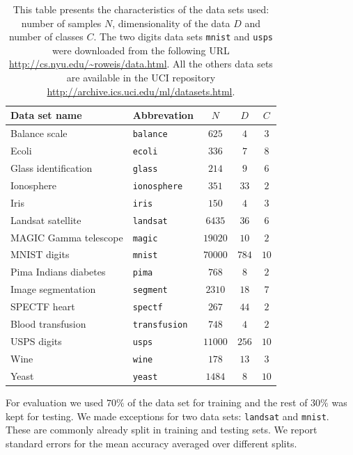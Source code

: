 \begin{table}%
  \centering
    \begin{tabular}{l l c c c} \toprule
	Data set name&Abbrevation&$N$&$D$&$C$\\ 
	\midrule
	Balance scale&\texttt{balance}&$625$&$4$&$3$\\ 
	Ecoli&\texttt{ecoli}&$336$&$7$&$8$\\ 
	Glass identification&\texttt{glass}&$214$&$9$&$6$\\ 
	Ionosphere&\texttt{ionosphere}&$351$&$33$&$2$\\ 
	Iris&\texttt{iris}&$150$&$4$&$3$\\ 
	Landsat satellite&\texttt{landsat}&$6435$&$36$&$6$\\ 
	MAGIC Gamma telescope&\texttt{magic}&$19020$&$10$&$2$\\ 
	MNIST digits&\texttt{mnist}&$70000$&$784$&$10$\\ 
	Pima Indians diabetes&\texttt{pima}&$768$&$8$&$2$\\ 
	Image segmentation&\texttt{segment}&$2310$&$18$&$7$\\ 
	SPECTF heart&\texttt{spectf}&$267$&$44$&$2$\\ 
	Blood transfusion&\texttt{transfusion}&$748$&$4$&$2$\\ 
	USPS digits&\texttt{usps}&$11000$&$256$&$10$\\ 
	Wine&\texttt{wine}&$178$&$13$&$3$\\ 
	Yeast&\texttt{yeast}&$1484$&$8$&$10$\\  
      \bottomrule
    \end{tabular}
    \caption{\small \small This table presents the characteristics of the data sets used: number of samples $N$, dimensionality of the data $D$ and number of classes $C$. The two digits data sets \texttt{mnist} and \texttt{usps} were downloaded from the following URL \protect\url{http://cs.nyu.edu/~roweis/data.html}. All the others data sets are available in the UCI repository \protect\url{http://archive.ics.uci.edu/ml/datasets.html}.}
    \label{tab:datasets}
\end{table}

For evaluation we used $70\%$ of the data set for training and the rest of $30\%$ was kept for testing. We made exceptions for two data sets: \texttt{landsat} and \texttt{mnist}. These are commonly already split in training and testing sets. We report standard errors for the mean accuracy averaged over different splits.

